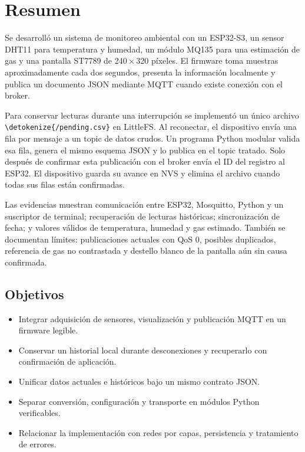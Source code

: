 \documentclass[11pt,a4paper]{article}
\newcommand{\code}[1]{\expandafter\nolinkurl\expandafter{\detokenize{#1}}}
\begin{document}
\section*{Resumen}
Se desarrolló un sistema de monitoreo ambiental con un ESP32-S3, un sensor DHT11 para temperatura y humedad, un módulo MQ135 para una estimación de gas y una pantalla ST7789 de 240\,$\times$\,320 píxeles. El firmware toma muestras aproximadamente cada dos segundos, presenta la información localmente y publica un documento JSON mediante MQTT cuando existe conexión con el broker.

Para conservar lecturas durante una interrupción se implementó un único archivo \code{/pending.csv} en LittleFS. Al reconectar, el dispositivo envía una fila por mensaje a un topic de datos crudos. Un programa Python modular valida esa fila, genera el mismo esquema JSON y lo publica en el topic tratado. Solo después de confirmar esta publicación con el broker envía el ID del registro al ESP32. El dispositivo guarda su avance en NVS y elimina el archivo cuando todas sus filas están confirmadas.

Las evidencias muestran comunicación entre ESP32, Mosquitto, Python y un suscriptor de terminal; recuperación de lecturas históricas; sincronización de fecha; y valores válidos de temperatura, humedad y gas estimado. También se documentan límites: publicaciones actuales con QoS 0, posibles duplicados, referencia de gas no contrastada y destello blanco de la pantalla aún sin causa confirmada.

\subsection*{Objetivos}
\begin{itemize}
\setlength\itemsep{1pt}
\item Integrar adquisición de sensores, visualización y publicación MQTT en un firmware legible.
\item Conservar un historial local durante desconexiones y recuperarlo con confirmación de aplicación.
\item Unificar datos actuales e históricos bajo un mismo contrato JSON.
\item Separar conversión, configuración y transporte en módulos Python verificables.
\item Relacionar la implementación con redes por capas, persistencia y tratamiento de errores.
\end{itemize}
\end{document}
